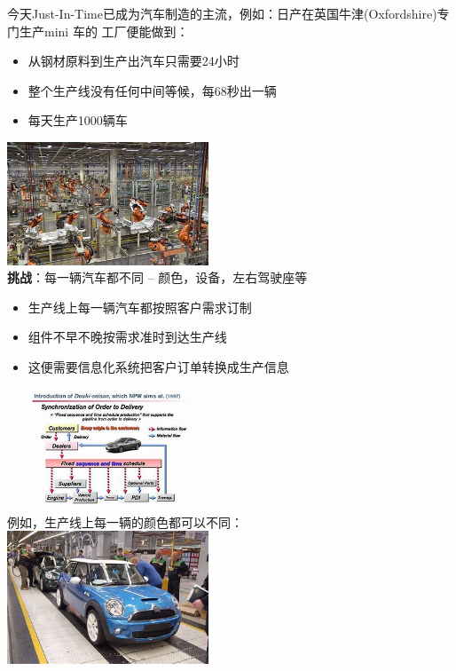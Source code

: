 今天Just-In-Time已成为汽车制造的主流，例如：日产在英国牛津(Oxfordshire)专门生产mini
车的 工厂便能做到：

\begin{itemize}
\tightlist
\item
  从钢材原料到生产出汽车只需要24小时
\item
  整个生产线没有任何中间等候，每68秒出一辆
\item
  每天生产1000辆车
\end{itemize}

\includegraphics[width=6cm]{NissanRobots-OIPh8UAC7FBjlaCmA_mBepJjQHaEi.jpg}\\
\textbf{挑战}：每一辆汽车都不同 -- 颜色，设备，左右驾驶座等

\begin{itemize}
\tightlist
\item
  生产线上每一辆汽车都按照客户需求订制
\item
  组件不早不晚按需求准时到达生产线
\item
  这便需要信息化系统把客户订单转换成生产信息
\end{itemize}

\includegraphics[width=6cm]{NissanJIT_OIPRQGKy67DWGTu-DQiOCqW2gHaEK.jpg}\\

例如，生产线上每一辆的颜色都可以不同：\\
\includegraphics[width=6cm]{NissanProdLineOIPwJFmfMl7q2_V8JaQi4kQ8QHaE6.jpg}\\

